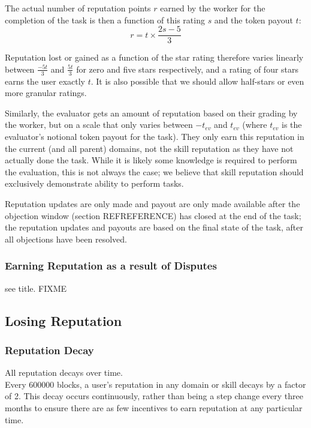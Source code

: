The actual number of reputation points $r$ earned by the worker for the completion of the task is then a function of this rating $s$ and the token payout $t$:
\begin{equation}\label{eq:stars-to-rep}
 r = t \times \frac{2s - 5}{3} 
\end{equation}
 
Reputation lost or gained as a function of the star rating therefore varies linearly between $\frac{-5t}{3}$ and $\frac{5t}{3}$ for zero and five stars respectively, and a rating of four stars earns the user exactly $t$. It is also possible that we should allow half-stars or even more granular ratings.

Similarly, the evaluator gets an amount of reputation based on their grading by the worker, but on a scale that only varies between $-t_{ev}$ and $t_{ev}$ (where $t_{ev}$ is the evaluator’s notional token payout for the task). They only earn this reputation in the current (and all parent) domains, not the skill reputation as they have not actually done the task. While it is likely some knowledge is required to perform the evaluation, this is not always the case; we believe that skill reputation should exclusively demonstrate ability to perform tasks.

Reputation updates are only made and payout are only made available after the objection window (section REFREFERENCE) has closed at the end of the task; the reputation updates and payouts are based on the final state of the task, after all objections have been resolved.

\subsubsection{Earning Reputation as a result of Disputes}\label{sec:earning-rep-in-disputes}
see title. FIXME



\subsection{Losing Reputation}\label{sec:losing-rep}

\subsubsection{Reputation Decay}
All reputation decays over time.\\
Every 600000 blocks, a user’s reputation in any domain or skill decays by a factor of 2. This decay occurs continuously, rather than being a step change every three months to ensure there are as few incentives to earn reputation at any particular time.

